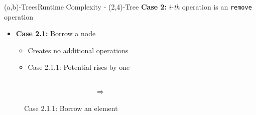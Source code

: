 \begin{frame}{(a,b)-Trees}{Runtime Complexity - (2,4)-Tree}
  \textbf{Case 2:}
  {\color{MainA}$i$}-\textit{th} operation is an
  \texttt{\color{MainA}remove} operation
  \begin{itemize}
    \item<2->
      \textbf{Case 2.1:} Borrow a node
      \begin{itemize}
        \item<3->
          Creates no additional operations
        \item<4->
          Case 2.1.1: Potential rises by one
      \end{itemize}
  \end{itemize}
  \begin{figure}
    \begin{columns}
      \begin{column}{0.35\linewidth}
        \begin{adjustbox}{width=\linewidth}
          
        \end{adjustbox}
      \end{column}
      \begin{column}{0.1\linewidth}
        \begin{center}
          $\Rightarrow$
        \end{center}
      \end{column}
      \begin{column}{0.35\linewidth}
        \begin{adjustbox}{width=\linewidth}
          
        \end{adjustbox}
      \end{column}
    \end{columns}
    \caption{Case 2.1.1: Borrow an element}
    \label{fig:a_b_tree:move_potential_1}
  \end{figure}
\end{frame}


